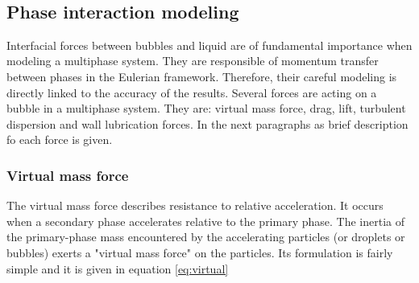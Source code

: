 \documentclass[11pt,a4paper]{article}
\begin{document}
\begin{table}[H]
\centering
{}\\
\caption{List of entries adopted in the \textbf{fvSolution} file for both the air and water.}
\label{tab:fvSolution}%
\end{table}%

\subsection{Phase interaction modeling}
\label{sub:forces}

Interfacial forces between bubbles and liquid are of fundamental importance when modeling a multiphase system. They are responsible of momentum transfer between phases in the Eulerian framework. Therefore, their careful modeling is directly linked to the accuracy of the results. Several forces are acting on a bubble in a multiphase system. They are:  virtual mass force, drag, lift, turbulent dispersion and wall lubrication forces. In the next paragraphs as brief description fo each force is given.


\subsubsection{Virtual mass force}
The virtual mass force describes resistance to relative acceleration. It occurs when a secondary phase accelerates relative to the primary phase. The inertia of the primary-phase mass encountered by the accelerating particles (or droplets or bubbles) exerts a "virtual mass force" on the particles. Its formulation is fairly simple and it is given in equation \ref{eq:virtual}
\end{document}
